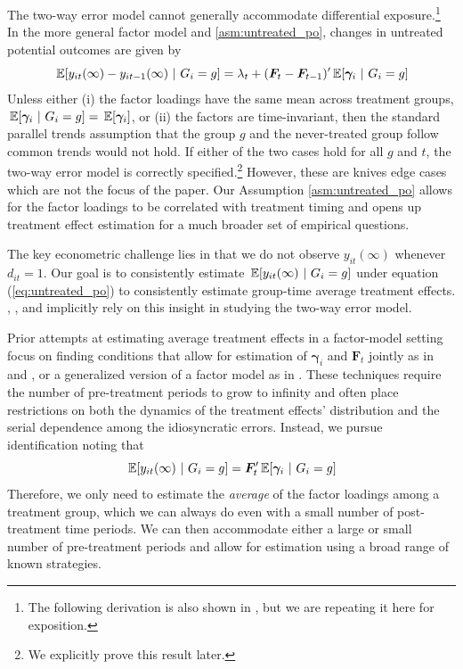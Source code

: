 The two-way error model cannot generally accommodate differential exposure.\footnote{The following derivation is also shown in \citet{Callaway_Karami_2020}, but we are repeating it here for exposition.} In the more general factor model and \autoref{asm:untreated_po}, changes in untreated potential outcomes are given by
\begin{equation*}
  \expec{y_{it}(\infty) - y_{it-1}(\infty)}{G_i = g} = \lambda_t + (\bm{F}_t - \bm{F}_{t-1})' \expec{\bm \gamma_i}{G_i = g}
\end{equation*}
Unless either (i) the factor loadings have the same mean across treatment groups, $\expec{\bm \gamma_i}{G_i = g} = \expec{\bm \gamma_i}$, or (ii) the factors are time-invariant, then the standard parallel trends assumption that the group $g$ and the never-treated group follow common trends would not hold. If either of the two cases hold for all $g$ and $t$, the two-way error model is correctly specified.\footnote{We explicitly prove this result later.} However, these are knives edge cases which are not the focus of the paper. Our Assumption \ref{asm:untreated_po} allows for the factor loadings to be correlated with treatment timing and opens up treatment effect estimation for a much broader set of empirical questions.

The key econometric challenge lies in that we do not observe $y_{it}(\infty)$ whenever $d_{it} = 1$. Our goal is to consistently estimate $\expec{y_{it}(\infty)}{G_i = g}$ under equation (\ref{eq:untreated_po}) to consistently estimate group-time average treatment effects. \citet{Gardner_2021}, \citet{Wooldridge_2021}, and \citet{Borusyak_Jaravel_Spiess_2021} implicitly rely on this insight in studying the two-way error model. 

Prior attempts at estimating average treatment effects in a factor-model setting focus on finding conditions that allow for estimation of $\bm \gamma_i$ and $\bm{F}_t$ jointly as in \citet{Gobillon_Magnac_2016} and \citet{Xu_2017}, or a generalized version of a factor model as in \citet{arkhangelsky2021synthetic}. These techniques require the number of pre-treatment periods to grow to infinity and often place restrictions on both the dynamics of the treatment effects' distribution and the serial dependence among the idiosyncratic errors. Instead, we pursue identification noting that 
\begin{equation}\label{eq:untreated_cond_expectation}
\expec{y_{it}(\infty)}{G_i = g} = \bm{F}_t' \expec{\bm \gamma_i}{G_i = g}
\end{equation}
Therefore, we only need to estimate the \textit{average} of the factor loadings among a treatment group, which we can always do even with a small number of post-treatment time periods. We can then accommodate either a large or small number of pre-treatment periods and allow for estimation using a broad range of known strategies.

